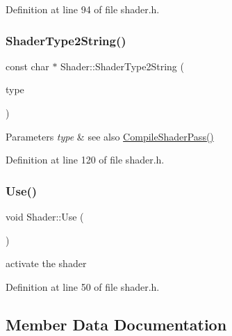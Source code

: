 Definition at line 94 of file shader.\+h.

\mbox{\label{class_shader_a36e9aa72c2db6f2a19b59b3ba56857a9}} 
\subsubsection{\texorpdfstring{ShaderType2String()}{ShaderType2String()}}
{\footnotesize\ttfamily const char $\ast$ Shader\+::\+Shader\+Type2\+String (\begin{DoxyParamCaption}\item[{G\+Lenum}]{type }\end{DoxyParamCaption})\hspace{0.3cm}{\ttfamily [inline]}}


\begin{DoxyParams}{Parameters}
{\em type} & see also \mbox{\hyperlink{class_shader_a3bca7990179d8def06caad688b58581c}{Compile\+Shader\+Pass()}} \\
\hline
\end{DoxyParams}


Definition at line 120 of file shader.\+h.

\mbox{\label{class_shader_a6b11327cff651ffdb22988b6917b1650}} 
\subsubsection{\texorpdfstring{Use()}{Use()}}
{\footnotesize\ttfamily void Shader\+::\+Use (\begin{DoxyParamCaption}{ }\end{DoxyParamCaption})\hspace{0.3cm}{\ttfamily [inline]}}

activate the shader 

Definition at line 50 of file shader.\+h.



\subsection{Member Data Documentation}
\mbox{\label{class_shader_a142a08b6fbdfc982d82ca10ee0b0f38d}} 
